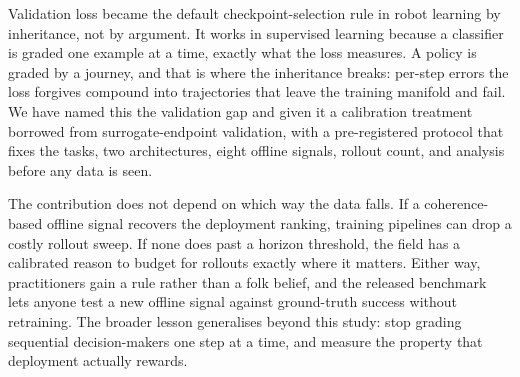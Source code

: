 Validation loss became the default checkpoint-selection rule in robot learning by inheritance,
not by argument. It works in supervised learning because a classifier is graded one example at
a time, exactly what the loss measures. A policy is graded by a journey, and that is where the
inheritance breaks: per-step errors the loss forgives compound into trajectories that leave the
training manifold and fail. We have named this the validation gap and given it a calibration
treatment borrowed from surrogate-endpoint validation, with a pre-registered protocol that
fixes the tasks, two architectures, eight offline signals, rollout count, and analysis before
any data is seen.

The contribution does not depend on which way the data falls. If a coherence-based offline
signal recovers the deployment ranking, training pipelines can drop a costly rollout sweep. If
none does past a horizon threshold, the field has a calibrated reason to budget for rollouts
exactly where it matters. Either way, practitioners gain a rule rather than a folk belief, and
the released benchmark lets anyone test a new offline signal against ground-truth success
without retraining. The broader lesson generalises beyond this study: stop grading sequential
decision-makers one step at a time, and measure the property that deployment actually rewards.
